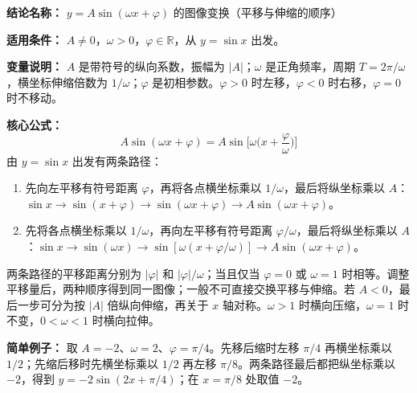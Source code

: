 \textbf{结论名称：} $y=A\sin(\omega x+\varphi)$ 的图像变换（平移与伸缩的顺序）

\textbf{适用条件：} $A\neq0$，$\omega>0$，$\varphi\in\mathbb R$，从 $y=\sin x$ 出发。

\textbf{变量说明：} $A$ 是带符号的纵向系数，振幅为 $|A|$；$\omega$ 是正角频率，周期 $T=2\pi/\omega$，横坐标伸缩倍数为 $1/\omega$；$\varphi$ 是初相参数。$\varphi>0$ 时左移，$\varphi<0$ 时右移，$\varphi=0$ 时不移动。

\textbf{核心公式：}
\[
\boxed{A\sin(\omega x+\varphi)=A\sin\!\Big[\omega\Big(x+\frac{\varphi}{\omega}\Big)\Big]}
\]
由 $y=\sin x$ 出发有两条路径：
\begin{enumerate}
\item 先向左平移有符号距离 $\varphi$，再将各点横坐标乘以 $1/\omega$，最后将纵坐标乘以 $A$：$\sin x\to\sin(x+\varphi)\to\sin(\omega x+\varphi)\to A\sin(\omega x+\varphi)$。
\item 先将各点横坐标乘以 $1/\omega$，再向左平移有符号距离 $\varphi/\omega$，最后将纵坐标乘以 $A$：$\sin x\to\sin(\omega x)\to\sin[\omega(x+\varphi/\omega)]\to A\sin(\omega x+\varphi)$。
\end{enumerate}
两条路径的平移距离分别为 $|\varphi|$ 和 $|\varphi|/\omega$；当且仅当 $\varphi=0$ 或 $\omega=1$ 时相等。调整平移量后，两种顺序得到同一图像；一般不可直接交换平移与伸缩。若 $A<0$，最后一步可分为按 $|A|$ 倍纵向伸缩，再关于 $x$ 轴对称。$\omega>1$ 时横向压缩，$\omega=1$ 时不变，$0<\omega<1$ 时横向拉伸。

\textbf{简单例子：} 取 $A=-2$、$\omega=2$、$\varphi=\pi/4$。先移后缩时左移 $\pi/4$ 再横坐标乘以 $1/2$；先缩后移时先横坐标乘以 $1/2$ 再左移 $\pi/8$。两条路径最后都把纵坐标乘以 $-2$，得到 $y=-2\sin(2x+\pi/4)$；在 $x=\pi/8$ 处取值 $-2$。
